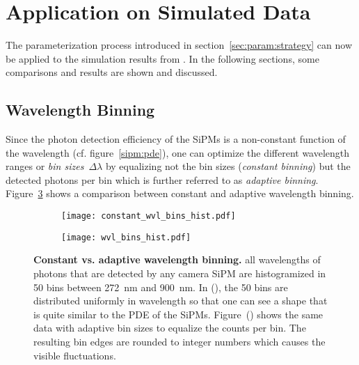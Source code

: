 \section{Application on Simulated Data}

The parameterization process introduced in section~\ref{sec:param:strategy} can now be applied to the simulation results from \geant. In the following sections, some comparisons and results are shown and discussed.

\subsection{Wavelength Binning}\label{sec:wvl_binning}

Since the photon detection efficiency of the SiPMs is a non-constant function of the wavelength (cf. figure~\ref{sipm:pde}), one can optimize the different wavelength ranges or \textit{bin sizes}~$\Delta\lambda$ by equalizing not the bin sizes (\textit{constant binning}) but the detected photons per bin which is further referred to as \textit{adaptive binning}. Figure~\ref{param:wvl_binning} shows a comparison between constant and adaptive wavelength binning.

\begin{figure}[h]
	\centering
	\begin{subfigure}[t]{0.49\textwidth}
		\texttt{[image: constant\_wvl\_bins\_hist.pdf]}
		\label{param:wvl_binning:constant}
	\end{subfigure}
	\hfill
	\begin{subfigure}[t]{0.49\textwidth}
		\texttt{[image: wvl\_bins\_hist.pdf]}
		\label{param:wvl_binning:adaptive}
	\end{subfigure}
	\caption[Constant vs. adaptive wavelength binning]{\textbf{Constant vs. adaptive wavelength binning.} all wavelengths of photons that are detected by any camera SiPM are histogramized in \num{50} bins between \SI{272}{\nano\meter} and \SI{900}{\nano\meter}. In (), the \num{50} bins are distributed uniformly in wavelength so that one can see a shape that is quite similar to the PDE of the SiPMs. Figure~() shows the same data with adaptive bin sizes to equalize the counts per bin. The resulting bin edges are rounded to integer numbers which causes the visible fluctuations.}
	\label{param:wvl_binning}
\end{figure}

